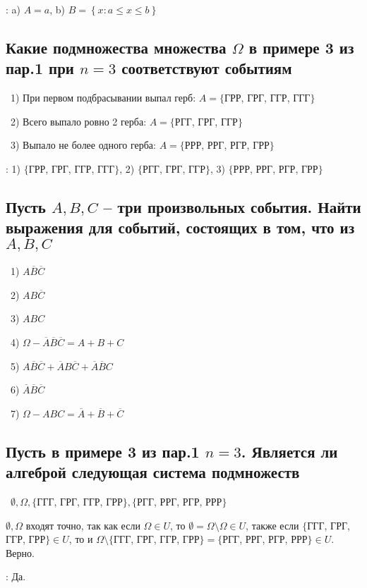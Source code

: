 \bigskip
{}: a) $A = a$, b) $B = \left\{x: a \le x \le b\right\}$


\subsection{Какие подмножества множества $\Omega$ в примере 3 из пар.1 при $n = 3$ соответствуют
событиям}

\noindent~1) При первом подбрасывании выпал герб: $A = \{$ГРР, ГРГ, ГГР, ГГГ$\}$

\medskip
\noindent~2) Всего выпало ровно 2 герба: $A = \{$РГГ, ГРГ, ГГР$\}$

\medskip
\noindent~3) Выпало не более одного герба: $A = \{$РРР, РРГ, РГР, ГРР$\}$

\bigskip
{}: 1) $\{$ГРР, ГРГ, ГГР, ГГГ$\}$, 2) $\{$РГГ, ГРГ, ГГР$\}$, 3) $\{$РРР, РРГ, РГР, ГРР$\}$


\subsection{Пусть $A, B, C$ -- три произвольных события. Найти выражения для событий, состоящих
в том, что из $A, B, C$}

\noindent~1) $A\overline{B}\overline{C}$

\smallskip
\noindent~2) $AB\overline{C}$

\smallskip
\noindent~3) $ABC$ 

\smallskip
\noindent~4) $\Omega - \overline{A}\overline{B}\overline{C} = A + B + C$

\smallskip
\noindent~5) $A\overline{B}\overline{C} + \overline{A}B\overline{C} + \overline{A}\overline{B}C$

\smallskip
\noindent~6) $\overline{A}\overline{B}\overline{C}$

\smallskip
\noindent~7) $\Omega - ABC = \overline{A} + \overline{B} + \overline{C}$


\subsection{Пусть в примере 3 из пар.1 $n = 3$. Является ли алгеброй следующая система подмножеств}

\noindent~$\emptyset, \Omega, \{$ГГГ, ГРГ, ГГР, ГРР$\}, \{$РГГ, РРГ, РГР, РРР$\}$

\smallskip
\noindent $\emptyset, \Omega$ входят точно, так как если $\Omega \in U$, то $\emptyset = \Omega \setminus
\Omega \in U$, также если $\{$ГГГ, ГРГ, ГГР, ГРР$\} \in U$, то и $\Omega \setminus \{$ГГГ, ГРГ, ГГР, ГРР$\} = 
\{$РГГ, РРГ, РГР, РРР$\} \in U$. Верно.

\bigskip
{}: Да.
